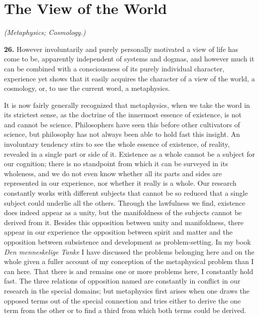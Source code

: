 \documentclass[12pt]{book}
\newcommand{\hnum}[1]{\textbf{#1.}\enspace}
\newcommand{\opage}[1]{\marginnote{\footnotesize\textit{[#1]}}}
\begin{document}
\chapter{The View of the World}
\label{ch:5}

\opage{81}\begin{center}
\textit{(Metaphysics; Cosmology.)}
\end{center}

\hnum{26} However involuntarily and purely personally motivated a view of life has come to be,
apparently independent of systems and dogmas, and however much it can be combined with a consciousness
of its purely individual character, experience yet shows that it easily acquires the character of a view
of the world, a cosmology, or, to use the current word, a metaphysics.

It is now fairly generally recognized that metaphysics, when we take the word in its strictest sense, as
the doctrine of the innermost essence of existence, is not and cannot be science. Philosophers have seen
this before other cultivators of science, but philosophy has not always been able to hold fast this
insight. An involuntary tendency stirs to see the whole essence of existence, of reality, revealed in a
single part or side of it. Existence as a whole cannot be a subject for our cognition; there is no
standpoint from which it can be surveyed in its wholeness, and we do not even know whether all its parts
and sides are represented in our experience, nor whether it really is a whole. Our research constantly
works with different subjects that cannot be so reduced that a single subject could underlie all the
others. Through the lawfulness we find, existence does indeed appear as a unity, but the manifoldness of
the subjects \opage{82}cannot be derived from it. Besides this opposition between unity and manifoldness, there
appear in our experience the opposition between spirit and matter and the opposition between subsistence
and development as problem-setting. In my book \textit{Den menneskelige Tanke} I have discussed the
problems belonging here and on the whole given a fuller account of my conception of the metaphysical
problem than I can here. That there is and remains one or more problems here, I constantly hold fast. The
three relations of opposition named are constantly in conflict in our research in the special domains; but
metaphysics first arises when one draws the opposed terms out of the special connection and tries either
to derive the one term from the other or to find a third from which both terms could be derived.
\end{document}
